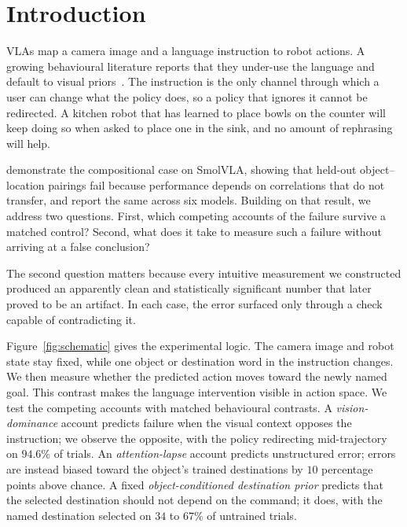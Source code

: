\documentclass{article}
\begin{document}
\section{Introduction}
\label{sec:intro}

VLAs map a camera image and a language instruction to robot actions. A growing behavioural
literature reports that they under-use the language and default to visual
priors~\citep{better,icbench,liberocf,robosem}. The instruction is the only channel through
which a user can change what the policy does, so a policy that ignores it cannot be redirected.
A kitchen robot that has learned to place bowls on the counter will keep doing so when asked to
place one in the sink, and no amount of rephrasing will help.

\citet{brittle} demonstrate the compositional case on SmolVLA, showing that held-out
object--location pairings fail because performance depends on correlations that do not
transfer, and \citet{scaleup} report the same across six models. Building on that result, we
address two questions. First, which competing accounts of the failure survive a matched
control? Second, what does it take to measure such a failure without arriving at a false
conclusion?

The second question matters because every intuitive measurement we constructed produced an
apparently clean and statistically significant number that later proved to be an artifact. In
each case, the error surfaced only through a check capable of contradicting it.

Figure~\ref{fig:schematic} gives the experimental logic. The camera image and robot state stay
fixed, while one object or destination word in the instruction changes. We then measure whether
the predicted action moves toward the newly named goal. This contrast makes the language
intervention visible in action space. We test the competing accounts with matched behavioural
contrasts. A
\emph{vision-dominance} account predicts failure when the visual context opposes the
instruction; we observe the opposite, with the policy redirecting mid-trajectory on $94.6\%$ of
trials. An \emph{attention-lapse} account predicts unstructured error; errors are instead biased
toward the object's trained destinations by $10$ percentage points above chance. A fixed
\emph{object-conditioned destination prior} predicts that the selected destination should not
depend on the command; it does, with the named destination selected on $34$ to $67\%$ of
untrained trials.
\end{document}
